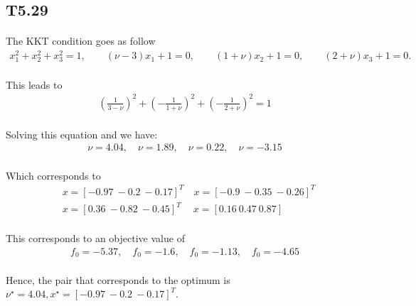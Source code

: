 \subsection*{T5.29}
\paragraph{}
The KKT condition goes as follow
\begin{align*}
x_1^2+x_2^2+x_3^2=1, \qquad (\nu-3)x_1 +1 = 0, \qquad (1+\nu)x_2+1 =0, \qquad (2+\nu)x_3 +1 =0.
\end{align*}
\paragraph{}
This leads to
\begin{align*}
 (\frac{1}{3-\nu})^2 +( -\frac{1}{1+\nu})^2 +(-\frac{1}{2+\nu})^2 =1 
\end{align*}
\paragraph{}
Solving this equation and we have:
\begin{align*}
\nu = 4.04, \quad \nu = 1.89, \quad \nu = 0.22, \quad \nu = -3.15
\end{align*}
\paragraph{}
Which corresponds to
\begin{align*}
&x =[-0.97\ -0.2\ -0.17]^T \quad x=[-0.9\ -0.35\ -0.26]^T \\ &x=[0.36\ -0.82\ -0.45]^T \quad \ x=[0.16\ 0.47\ 0.87]
\end{align*}
\paragraph{}
This corresponds to an objective value of
\begin{align*}
f_0 = -5.37, \quad f_0 = -1.6, \quad f_0 = -1.13, \quad f_0 = -4.65
\end{align*}
\paragraph{}
Hence, the pair that corresponds to the optimum is $\nu^\star = 4.04, x^\star =[-0.97\ -0.2\ -0.17]^T$.